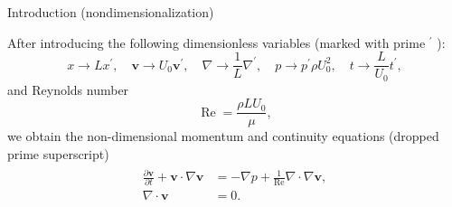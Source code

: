 \documentclass{beamer}
\begin{document}
  \begin{frame}{Introduction (nondimensionalization)}
  
  After introducing the following dimensionless variables (marked with prime ${ }^{\prime}$ ):
\begin{equation*}
	x\to Lx^{\prime},  \quad 
	\boldsymbol{v}\to U_0\boldsymbol{v}^{\prime}, \quad 
	\nabla\to \frac{1}{L}\nabla^{\prime}, \quad 
	p\to p^{\prime} \rho U_0^2, \quad 
	t\to \frac{L}{U_0}t^{\prime},
\end{equation*}
and Reynolds number 
\begin{equation*}
\operatorname{Re}=\frac{\rho L U_0}{\mu},
\end{equation*}
we obtain the non-dimensional momentum and continuity equations (dropped prime superscript)
	\begin{align}\label{eqs:NSE-nondim}
	\begin{split}
		\frac{\partial \boldsymbol{v}}{\partial t} + \boldsymbol{v} \cdot \nabla \boldsymbol{v} &= -\nabla p + \frac{1}{\operatorname{Re}} \nabla \cdot \nabla \boldsymbol{v},\\
		\nabla \cdot\boldsymbol{v}&=0.
	\end{split}
	\end{align}
  \end{frame}
\end{document}
